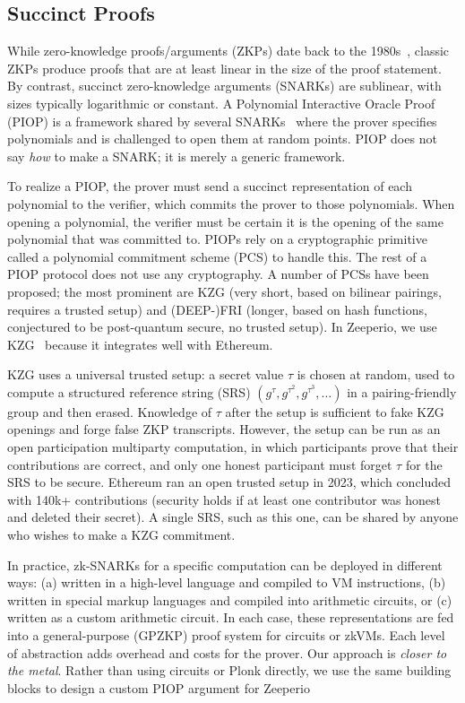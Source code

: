 \subsection{Succinct Proofs}

While zero-knowledge proofs/arguments (ZKPs) date back to the 1980s~\cite{GMW86,BCC88}, classic ZKPs produce proofs that are at least linear in the size of the proof statement. 
By contrast, succinct zero-knowledge arguments (SNARKs) are sublinear, with sizes typically logarithmic or constant. 
A Polynomial Interactive Oracle Proof (PIOP) is a framework shared by several SNARKs~\cite{MBKM19,CHM+20,BFS20} where the prover specifies polynomials and is challenged to open them at random points. 
PIOP does not say \textit{how} to make a SNARK; it is merely a generic framework. 

To realize a PIOP, the prover must send a succinct representation of each polynomial to the verifier, which commits the prover to those polynomials. 
When opening a polynomial, the verifier must be certain it is the opening of the same polynomial that was committed to. 
PIOPs rely on a cryptographic primitive called a polynomial commitment scheme (PCS) to handle this. 
The rest of a PIOP protocol does not use any cryptography. 
A number of PCSs have been proposed; the most prominent are KZG (very short, based on bilinear pairings, requires a trusted setup) and (DEEP-)FRI (longer, based on hash functions, conjectured to be post-quantum secure, no trusted setup). 
In Zeeperio, we use KZG~\cite{KZG10} because it integrates well with Ethereum.

KZG uses a universal trusted setup: a secret value $\tau$ is chosen at random, used to compute a structured reference string (SRS) $(g^\tau, g^{\tau^2},g^{\tau^3},\ldots)$ in a pairing-friendly group and then erased. 
Knowledge of $\tau$ after the setup is sufficient to fake KZG openings and forge false ZKP transcripts. 
However, the setup can be run as an open participation multiparty computation, in which participants prove that their contributions are correct, and only one honest participant must forget $\tau$ for the SRS to be secure. 
Ethereum ran an open trusted setup in 2023, which concluded with 140k+ contributions (security holds if at least one contributor was honest and deleted their secret). 
A single SRS, such as this one, can be shared by anyone who wishes to make a KZG commitment.

In practice, zk-SNARKs for a specific computation can be deployed in different ways: (a) written in a high-level language and compiled to VM instructions, (b) written in special markup languages and compiled into arithmetic circuits, or (c) written as a custom arithmetic circuit. 
In each case, these representations are fed into a general-purpose (GPZKP) proof system for circuits or zkVMs. 
Each level of abstraction adds overhead and costs for the prover. 
Our approach is \emph{closer to the metal}. 
Rather than using circuits or Plonk directly, we use the same building blocks to design a custom PIOP argument for Zeeperio

